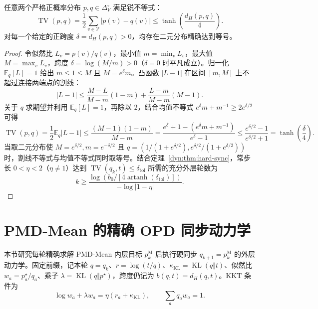 \documentclass[lang=cn,scheme=chinese,openany]{elegantbook}
\newcommand{\E}{\mathbb E}
\newcommand{\KL}{\operatorname{KL}}
\newcommand{\TV}{\operatorname{TV}}
\begin{document}
\begin{theorem}
\label{dyn:thm:hs-sharp-tv}
任意两个严格正概率分布 $p,q\in\Delta_V^\circ$ 满足锐不等式：
\begin{equation}\label{dyn:eq:hs-sharp-tv}
 \TV(p,q)=\frac12\sum_{v\in\mathcal V}|p(v)-q(v)|\leq\tanh\!\left(\frac{d_H(p,q)}4\right).
\end{equation}
对每一个给定的正跨度 $\delta=d_H(p,q)>0$，均存在二元分布精确达到等号。
\end{theorem}
\begin{proof}
令似然比 $L_v=p(v)/q(v)$，最小值 $m=\min_v L_v$，最大值 $M=\max_v L_v$，跨度 $\delta=\log(M/m)>0$（$\delta=0$ 时平凡成立）。归一化 $\E_q[L]=1$ 给出 $m\le 1\le M$ 且 $M=e^\delta m$。凸函数 $|L-1|$ 在区间 $[m,M]$ 上不超过连接两端点的割线：
\begin{equation*}
 |L-1|\leq\frac{M-L}{M-m}(1-m)+\frac{L-m}{M-m}(M-1).
\end{equation*}
关于 $q$ 求期望并利用 $\E_q[L]=1$，再除以 $2$，结合均值不等式 $e^\delta m+m^{-1}\ge 2 e^{\delta/2}$ 可得
\begin{equation*}
 \TV(p,q)=\frac12\E_q|L-1|\leq\frac{(M-1)(1-m)}{M-m}
 =\frac{e^\delta+1-(e^\delta m+m^{-1})}{e^\delta-1}
 \le\frac{e^{\delta/2}-1}{e^{\delta/2}+1}=\tanh\!\left(\frac{\delta}{4}\right).
\end{equation*}
当取二元分布使 $M=e^{\delta/2}, m=e^{-\delta/2}$ 且 $q=(1/(1+e^{\delta/2}), e^{\delta/2}/(1+e^{\delta/2}))$ 时，割线不等式与均值不等式同时取等号。结合定理~\ref{dyn:thm:hard-sync}，常步长 $0<\eta<2$（$\eta\ne 1$）达到 $\TV(q_k,t)\le\delta_{\mathrm{tol}}$ 所需的充分外层轮数为
\begin{equation*}
 k\geq\frac{\log\!\left(b_0/[4\operatorname{artanh}(\delta_{\mathrm{tol}})]\right)}{-\log|1-\eta|}.
\end{equation*}
\end{proof}

\section{PMD-Mean 的精确 OPD 同步动力学}
\label{dyn:mean-dynamics}

本节研究每轮精确求解 PMD-Mean 内层目标 $p_k^{\mathrm M}$ 后执行硬同步 $q_{k+1}=p_k^{\mathrm M}$ 的外层动力学。固定前缀，记本轮 $q=q_k$、$r=\log(t/q)$、$\kappa_{\mathrm{KL}}=\KL(q\Vert t)$、似然比 $w_a=p_a^\star/q_a$、乘子 $\lambda=\KL(q\Vert p^\star)$，跨度仍记为 $b(q,t)=d_H(q,t)$。KKT 条件为
\begin{equation}
 \log w_a+\lambda w_a=\eta(r_a+\kappa_{\mathrm{KL}}),
 \qquad \sum_a q_a w_a=1.
 \label{dyn:eq:mean-hard-sync-kkt}
\end{equation}
\end{document}

